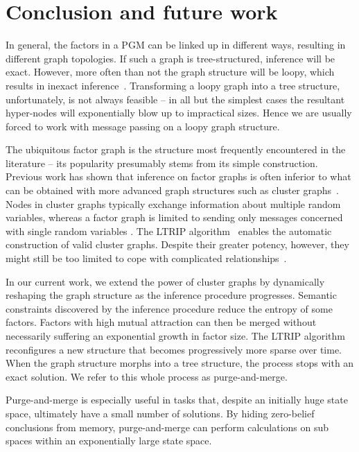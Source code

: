 \documentclass{ieeeaccess}
\begin{document}
{	\section{Conclusion and future work}
	
	In general, the factors in a PGM can be linked up in different ways, resulting in different graph topologies. If such a graph is tree-structured, inference will be exact. However, more often than not the graph structure will be loopy, which results in inexact inference~\cite{koller}. Transforming a loopy graph into a tree structure, unfortunately, is not always feasible -- in all but the simplest cases the resultant hyper-nodes will exponentially blow up to impractical sizes. Hence we are usually forced to work with message passing on a loopy graph structure. 
	
	The ubiquitous factor graph is the structure most frequently encountered in the literature -- its popularity presumably stems from its simple construction. Previous work has shown that inference on factor graphs is often inferior to what can be obtained with more advanced graph structures such as cluster graphs~\cite{streicher}. Nodes in cluster graphs typically exchange information about multiple random variables, whereas a factor graph is limited to sending only messages concerned with single random variables \cite[p406]{koller}. The LTRIP algorithm~\cite{streicher} enables the automatic construction of valid cluster graphs. Despite their greater potency, however, they might still be too limited to cope with complicated relationships~\cite{streicher}. 
	
	In our current work, we extend the power of cluster graphs by dynamically reshaping the graph structure as the inference procedure progresses. Semantic constraints discovered by the inference procedure reduce the entropy of some factors. Factors with high mutual attraction can then be merged without necessarily suffering an exponential growth in factor size. The LTRIP algorithm reconfigures a new structure that becomes progressively more sparse over time. When the graph structure morphs into a tree structure, the process stops with an exact solution. We refer to this whole process as purge-and-merge. 
	
	Purge-and-merge is especially useful in tasks that, despite an initially huge state space, ultimately have a small number of solutions. By hiding zero-belief conclusions from memory, purge-and-merge can perform calculations on sub spaces within an exponentially large state space.
	
}
\end{document}
